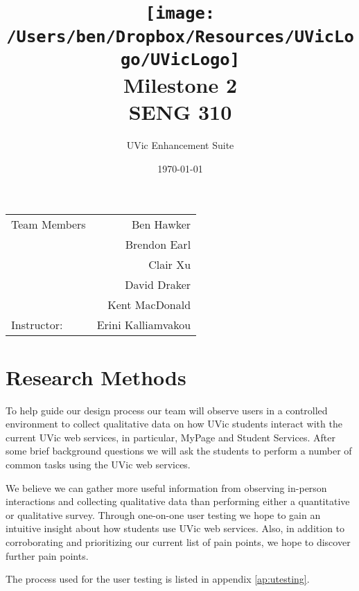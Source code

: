 \documentclass{article}
\title{\texttt{[image: /Users/ben/Dropbox/Resources/UVicLogo/UVicLogo]} \\ \vspace{7mm} Milestone 2 \\ SENG 310} %
\author{UVic Enhancement Suite} %
\date{\today} %
\begin{document}
\maketitle %

\begin{center}
\begin{tabular}{l r}
Team Members & Ben Hawker \\
 & Brendon Earl \\
 & Clair Xu \\
 & David Draker \\
 & Kent MacDonald \\
Instructor: & Erini Kalliamvakou  %
\end{tabular}
\end{center}


\tableofcontents


\section{Research Methods}

To help guide our design process our team will observe users in a controlled environment to collect qualitative data on how UVic students interact with the current UVic web services, in particular, MyPage and Student Services. After some brief background questions we will ask the students to perform a number of common tasks using the UVic web services.

We believe we can gather more useful information from observing in-person interactions and collecting qualitative data than performing either a quantitative or qualitative survey. Through one-on-one user testing we hope to gain an intuitive insight about how students use UVic web services. Also, in addition to corroborating and prioritizing our current list of pain points, we hope to discover further pain points.

The process used for the user testing is listed in appendix \ref{ap:utesting}.

\end{document}
